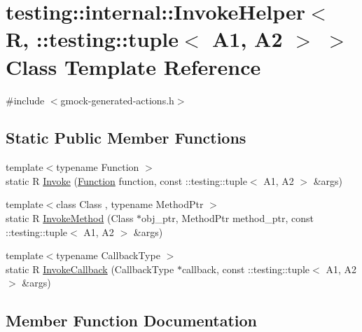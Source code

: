 \hypertarget{classtesting_1_1internal_1_1InvokeHelper_3_01R_00_01_1_1testing_1_1tuple_3_01A1_00_01A2_01_4_01_4}{}\section{testing\+::internal\+::Invoke\+Helper$<$ R, \+::testing\+::tuple$<$ A1, A2 $>$ $>$ Class Template Reference}
\label{classtesting_1_1internal_1_1InvokeHelper_3_01R_00_01_1_1testing_1_1tuple_3_01A1_00_01A2_01_4_01_4}


{\ttfamily \#include $<$gmock-\/generated-\/actions.\+h$>$}

\subsection*{Static Public Member Functions}
\begin{DoxyCompactItemize}
\item 
{\footnotesize template$<$typename Function $>$ }\\static R \mbox{\hyperlink{classtesting_1_1internal_1_1InvokeHelper_3_01R_00_01_1_1testing_1_1tuple_3_01A1_00_01A2_01_4_01_4_af3863b86ae4b7fbfd5a5f14e20b57423}{Invoke}} (\mbox{\hyperlink{structtesting_1_1internal_1_1Function}{Function}} function, const \+::testing\+::tuple$<$ A1, A2 $>$ \&args)
\item 
{\footnotesize template$<$class Class , typename Method\+Ptr $>$ }\\static R \mbox{\hyperlink{classtesting_1_1internal_1_1InvokeHelper_3_01R_00_01_1_1testing_1_1tuple_3_01A1_00_01A2_01_4_01_4_a227b8f07bfda13f6cb390655fc84f1ee}{Invoke\+Method}} (Class $\ast$obj\+\_\+ptr, Method\+Ptr method\+\_\+ptr, const \+::testing\+::tuple$<$ A1, A2 $>$ \&args)
\item 
{\footnotesize template$<$typename Callback\+Type $>$ }\\static R \mbox{\hyperlink{classtesting_1_1internal_1_1InvokeHelper_3_01R_00_01_1_1testing_1_1tuple_3_01A1_00_01A2_01_4_01_4_ac03df8405713ccfd5b91887e701c591b}{Invoke\+Callback}} (Callback\+Type $\ast$callback, const \+::testing\+::tuple$<$ A1, A2 $>$ \&args)
\end{DoxyCompactItemize}


\subsection{Member Function Documentation}
\mbox{\label{classtesting_1_1internal_1_1InvokeHelper_3_01R_00_01_1_1testing_1_1tuple_3_01A1_00_01A2_01_4_01_4_af3863b86ae4b7fbfd5a5f14e20b57423}} 
